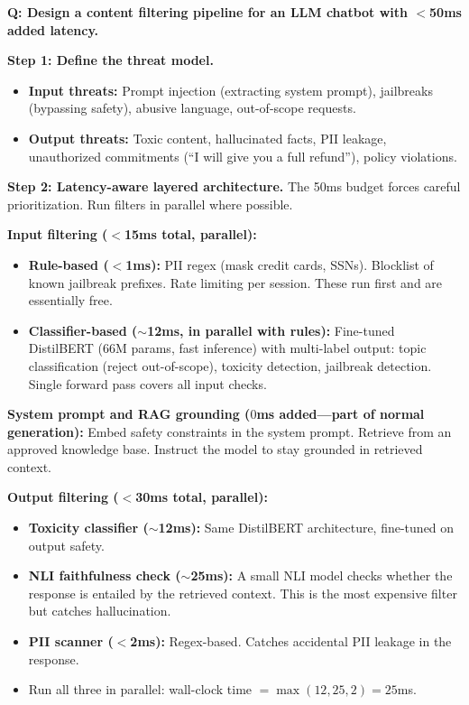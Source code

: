 \begin{interviewq}
\textbf{Q: Design a content filtering pipeline for an LLM chatbot with $<$50ms added latency.}

 \quad {} \quad \badgefreq{\freqhigh}

\stronganswer

\textbf{Step 1: Define the threat model.}
\begin{itemize}
    \item \textbf{Input threats:} Prompt injection (extracting system prompt), jailbreaks (bypassing safety), abusive language, out-of-scope requests.
    \item \textbf{Output threats:} Toxic content, hallucinated facts, PII leakage, unauthorized commitments (``I will give you a full refund''), policy violations.
\end{itemize}

\textbf{Step 2: Latency-aware layered architecture.} The 50ms budget forces careful prioritization. Run filters in parallel where possible.

\textbf{Input filtering ($<$15ms total, parallel):}
\begin{itemize}
    \item \textbf{Rule-based ($<$1ms):} PII regex (mask credit cards, SSNs). Blocklist of known jailbreak prefixes. Rate limiting per session. These run first and are essentially free.
    \item \textbf{Classifier-based ($\sim$12ms, in parallel with rules):} Fine-tuned DistilBERT (66M params, fast inference) with multi-label output: topic classification (reject out-of-scope), toxicity detection, jailbreak detection. Single forward pass covers all input checks.
\end{itemize}

\textbf{System prompt and RAG grounding ($0$ms added---part of normal generation):} Embed safety constraints in the system prompt. Retrieve from an approved knowledge base. Instruct the model to stay grounded in retrieved context.

\textbf{Output filtering ($<$30ms total, parallel):}
\begin{itemize}
    \item \textbf{Toxicity classifier ($\sim$12ms):} Same DistilBERT architecture, fine-tuned on output safety.
    \item \textbf{NLI faithfulness check ($\sim$25ms):} A small NLI model checks whether the response is entailed by the retrieved context. This is the most expensive filter but catches hallucination.
    \item \textbf{PII scanner ($<$2ms):} Regex-based. Catches accidental PII leakage in the response.
    \item Run all three in parallel: wall-clock time $= \max(12, 25, 2) = 25$ms.
\end{itemize}


\end{interviewq}
